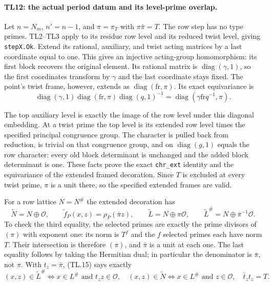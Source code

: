 \paragraph{TL12: the actual period datum and its level-prime overlap.}
Let $n=N_m$, $n'=n-1$, and $\pi=\pi_T$ with
$\pi\bar\pi=T$. The row step has no type primes. TL2--TL3 apply to
its residue row level and its reduced twist level, giving
\texttt{stepX.Ok}. Extend its rational, auxiliary, and twist acting
matrices by a last coordinate equal to one. This gives an
injective acting-group homomorphism: its first block recovers the
original element. Its rational matrix is
$\operatorname{diag}(\gamma,1)$, so the first coordinates transform
by $\gamma$ and the last coordinate stays fixed.
The point's twist frame, however, extends as
$\operatorname{diag}(\mathrm{fr},\pi)$. Its exact equivariance is
\[
 \operatorname{diag}(\gamma,1)
 \operatorname{diag}(\mathrm{fr},\pi)
 \operatorname{diag}(q,1)^{-1}
 =\operatorname{diag}(\gamma\mathrm{fr}q^{-1},\pi).
\]

The top auxiliary level is exactly the image of the row level under
this diagonal embedding. At a twist prime the top level is its
extended row level times the specified principal congruence group.
The character is pulled back from reduction, is trivial on that
congruence group, and on $\operatorname{diag}(g,1)$ equals the row
character: every old block determinant is unchanged and the added
block determinant is one. These facts prove the exact
\texttt{chr\_ext} identity and the equivariance of the extended
framed decoration. Since $T$ is excluded at every twist prime,
$\pi$ is a unit there, so the specified extended frames are valid.

For a row lattice $N=N^\#$ the extended decoration has
\[
 \widetilde N=N\oplus\mathcal O,\qquad
 \widetilde f_P(x,z)=\rho_P(\bar\pi z),\qquad
 \widetilde L=N\oplus\pi\mathcal O,
 \qquad\widetilde L^\#=N\oplus\bar\pi^{-1}\mathcal O.
 \tag{TL.15}
\]
To check the third equality, the selected primes are exactly the
prime divisors of $(\pi)$ with exponent one: its norm is $T^f$ and
the $f$ selected primes each have norm $T$. Their intersection is
therefore $(\pi)$, and $\bar\pi$ is a unit at each one. The last
equality follows by taking the Hermitian dual; in particular the
denominator is $\bar\pi$, not $\pi$.
With $t_z=\bar\pi$, (TL.15) says exactly
\[
 (x,z)\in\widetilde L^\#\iff x\in L^\#\text{ and }t_zz\in\mathcal O,
 \quad (x,z)\in\widetilde N\iff x\in L^\#\text{ and }z\in\mathcal O,
 \quad \bar t_z t_z=T.                            \tag{TL.16}
\]

